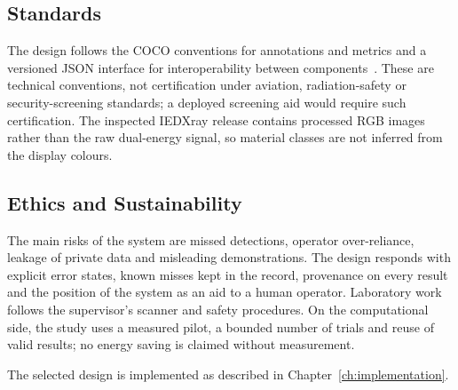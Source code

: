 \subsection{Standards}
The design follows the COCO conventions for annotations and metrics and a versioned
JSON interface for interoperability between components~\citep{lin2014coco}. These
are technical conventions, not certification under aviation, radiation-safety or
security-screening standards; a deployed screening aid would require such
certification. The inspected IEDXray release contains processed RGB images rather
than the raw dual-energy signal, so material classes are not inferred from the
display colours.

\subsection{Ethics and Sustainability}
The main risks of the system are missed detections, operator over-reliance,
leakage of private data and misleading demonstrations. The design responds with
explicit error states, known misses kept in the record, provenance on every result
and the position of the system as an aid to a human operator. Laboratory work
follows the supervisor's scanner and safety procedures. On the computational side,
the study uses a measured pilot, a bounded number of trials and reuse of valid
results; no energy saving is claimed without measurement.

The selected design is implemented as described in Chapter~\ref{ch:implementation}.
